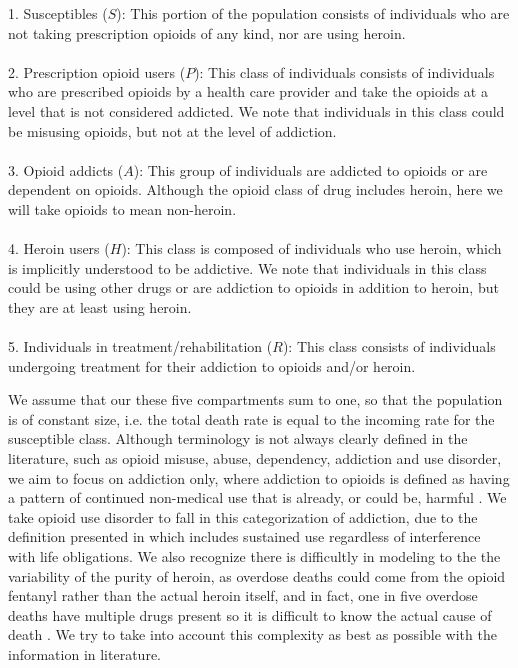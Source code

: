 \documentclass[12pt]{article}
\begin{document}
1. Susceptibles ($S$): This portion of the population consists of individuals who are not taking prescription opioids of any kind, nor are using heroin. \\ \\
2. Prescription opioid users ($P$): This class of individuals consists of individuals who are prescribed opioids by a health care provider and take the opioids at a level that is not considered addicted. We note that individuals in this class could be misusing opioids, but not at the level of addiction.  \\ \\
3. Opioid addicts ($A$): This group of individuals are addicted to opioids or are dependent on opioids. Although the opioid class of drug includes heroin, here we will take opioids to mean non-heroin. \\ \\
4. Heroin users ($H$): This class is composed of individuals who use heroin, which is implicitly understood to be addictive. We note that individuals in this class could be using other drugs or are addiction to opioids in addition to heroin, but they are at least using heroin. \\ \\
5. Individuals in treatment/rehabilitation ($R$): This class consists of individuals undergoing treatment for their addiction to opioids and/or heroin. 

We assume that our these five compartments sum to one, so that the population is of constant size, i.e. the total death rate is equal to the incoming rate for the susceptible class. Although terminology is not always clearly defined in the literature, such as opioid misuse, abuse, dependency, addiction and use disorder, we aim to focus on addiction only, where addiction to opioids is defined as having a pattern of continued non-medical use that is already, or could be, harmful \cite{Vowles}. We take opioid use disorder to fall in this categorization of addiction, due to the definition presented in \cite{SAMSHA2} which includes sustained use regardless of interference with life obligations. We also recognize there is difficultly in modeling to the the variability of the purity of heroin, as overdose deaths could come from the opioid fentanyl rather than the actual heroin itself, and in fact, one in five overdose deaths have multiple drugs present so it is difficult to know the actual cause of death \cite{CDC4}. We try to take into account this complexity as best as possible with the information in literature. 
\end{document}
